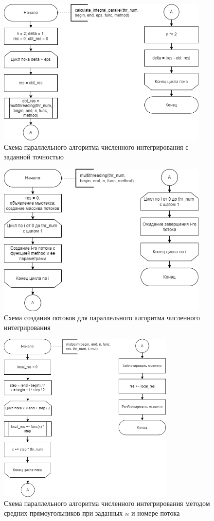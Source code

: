 \begin{figure}[h!btp]
	\centering
	\includegraphics[width=300pt]{inc/calc_int_par.png}
	\caption{Схема параллельного алгоритма численного интегрирования с заданной точностью}
	\label{fig:diagram-calc-int-par}	
\end{figure}

\begin{figure}[h!btp]
	\centering
	\includegraphics[width=300pt]{inc/multithreading.png}
	\caption{Схема создания потоков для параллельного алгоритма численного интегрирования}
	\label{fig:diagram-multithreading}	
\end{figure}

\clearpage

\begin{figure}[h!btp]
	\centering
	\includegraphics[width=250pt]{inc/int_midpoint_par.png}
	\caption{Схема параллельного алгоритма численного интегрирования методом средних прямоугольников при заданных $n$ и номере потока}
	\label{fig:diagram-int-midpoint-par}	
\end{figure}

